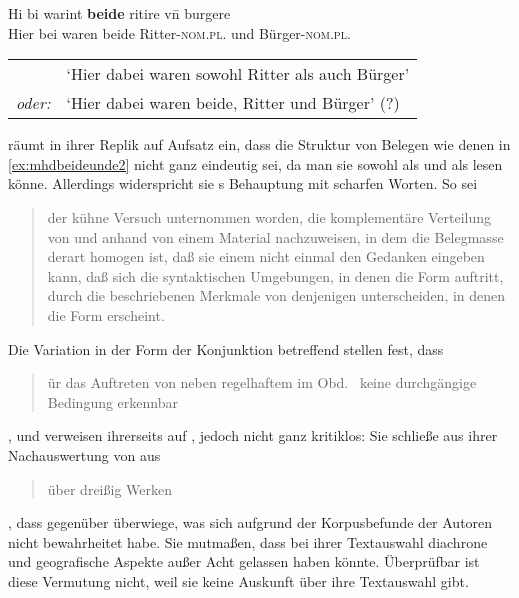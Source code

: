 \begin{exe}
\ex\label{ex:mhdbeideunde2}
	\gll Hi bi warint \textbf{beide} ritire vn̄ burgere \\
		Hier bei waren beide Ritter-\textsc{nom.pl.\MascI} und
			Bürger-\textsc{nom.pl.\MascA} \\
	\begin{taggedline}{\parencites(Rosheim, Dépt.~Bas-Rhin, 1286)[\pno~N~321, 245.29]{cao5}}
	\trans %
		\begin{tabular}{@{} r @{~} l @{}}
				  & `Hier dabei waren sowohl Ritter als auch Bürger' \\
			\emph{oder:} & `Hier dabei waren beide, Ritter und Bürger' (?)
			\\
		\end{tabular}
	\end{taggedline}
\end{exe}

\citet[187]{gjelsten1980} räumt in ihrer Replik auf 
Aufsatz ein, dass die Struktur von Belegen wie denen in \cref{ex:mhdbeideunde2}
nicht ganz eindeutig sei, da man sie sowohl als  und als
 lesen könne. Allerdings widerspricht sie
\citeauthor{askedal1974}s Behauptung mit scharfen Worten. So sei
\blockcquote[196]{gjelsten1980}{der kühne Versuch unternommen worden, die
komplementäre Verteilung von  und  anhand von einem
Material nachzuweisen, in dem die Belegmasse derart homogen ist, daß sie einem
nicht einmal den Gedanken eingeben kann, daß sich die syntaktischen Umgebungen,
in denen die Form  auftritt, durch die beschriebenen Merkmale von
denjenigen unterscheiden, in denen die Form  erscheint.}

Die Variation in der Form der Konjunktion betreffend stellen \citet[628]{ksw2}
fest, dass \blockquote{ür das Auftreten von  neben
regelhaftem  im Obd.\ \textelp{} keine durchgängige Bedingung
erkennbar }, und verweisen ihrerseits auf \citet{gjelsten1980},
jedoch nicht ganz kritiklos: Sie schließe aus ihrer Nachauswertung von
 aus
\blockcquote[198]{gjelsten1980}{über dreißig Werken}, dass 
gegenüber  überwiege, was sich aufgrund der Korpusbefunde der
Autoren nicht bewahrheitet habe. Sie mutmaßen, dass \citeauthor{gjelsten1980}
bei ihrer Textauswahl diachrone und geografische Aspekte außer Acht gelassen
haben könnte. Überprüfbar ist diese Vermutung nicht, weil sie keine Auskunft
über ihre Textauswahl gibt.

